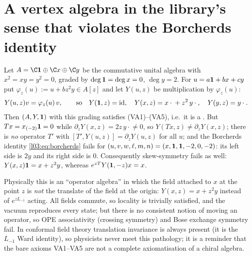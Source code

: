 \section[A counterexample to the Borcherds identity]{A vertex algebra in the library's sense that violates the Borcherds identity}\label{l03:sec:counter}

\begin{theorem}\label{l03:thm:counter}
Let $A = \C\lthreevac\oplus\C x\oplus\C y$ be the commutative unital algebra with
$x^2 = xy = y^2 = 0$, graded by $\deg\mathbf{1} = \deg x = 0$, $\deg y = 2$. For $u = a\mathbf{1} + bx + cy$
put $\varphi_z(u) := u + bz^2y\in A[z]$ and let $Y(u,z)$ be multiplication by $\varphi_z(u)$:
\begin{equation*}
Y(u,z)v = \varphi_z(u)\,v ,\qquad\text{so}\quad Y(\mathbf{1},z) = \mathrm{id},\quad Y(x,z) = x\cdot{} + z^2\,y\cdot{},\quad Y(y,z) = y\cdot{} .
\end{equation*}
Then $(A,Y,\mathbf{1})$ with this grading satisfies (VA1)--(VA5), i.e.\ it is a
. But $Tx = x_{(-2)}\mathbf{1} = 0$ while $\partial_zY(x,z) = 2z\,y\cdot{}\ne0$, so
$Y(Tx,z)\ne\partial_zY(x,z)$; there is \emph{no} operator $T'$ with $[T',Y(u,z)] = \partial_zY(u,z)$
for all $u$; and the Borcherds identity \eqref{l03:eq:borcherds} fails for
$(u,v,w,\ell,m,n) = (x,\mathbf{1},\mathbf{1},-2,0,-2)$: its left side is $2y$ and its right side is $0$.
Consequently skew-symmetry fails as well: $Y(x,z)\mathbf{1} = x+z^2y$, whereas
$e^{zT}Y(\mathbf{1},-z)x = x$.
\end{theorem}

\begin{physics}
Physically this is an ``operator algebra'' in which the field attached to $x$ at the point $z$ is
\emph{not} the translate of the field at the origin: $Y(x,z) = x + z^2y$ instead of $e^{zL_{-1}}$
acting. All fields commute, so locality is trivially satisfied, and the vacuum reproduces every
state; but there is no consistent notion of moving an operator, so OPE associativity (crossing
symmetry) and Bose exchange symmetry fail. In conformal field theory translation invariance is
always present (it is the $L_{-1}$ Ward identity), so physicists never meet this pathology; it is
a reminder that the bare axioms VA1--VA5 are not a complete axiomatisation of a chiral algebra.
\end{physics}

